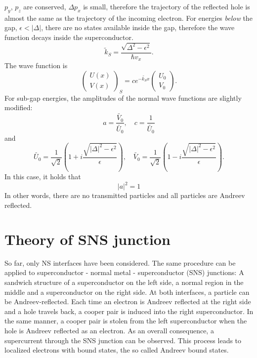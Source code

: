 $p_y$, $p_z$ are conserved, $\Delta p_x$ is small, therefore the trajectory of the reflected hole is almost the same as the trajectory of the incoming electron.
\newline
\newline
For energies \emph{below} the gap, $\epsilon < |\Delta |$, there are no states available inside the gap, therefore the wave function decays inside the superconductor. 
\begin{equation}
\tilde{k}_S= \frac{\sqrt{\Delta^2 - \epsilon^2 }}{\hbar v_x}.
\end{equation}
The wave function is
\begin{equation}
\begin{pmatrix} U(x) \\ V(x) \end{pmatrix}_S = c e^{- \tilde{k_S} x } \begin{pmatrix} U_0 \\ V_0 \end{pmatrix}.
\end{equation}
For sub-gap energies, the amplitudes of the normal wave functions are slightly modified:
\begin{equation}
a = \frac{\tilde{V_0}}{\tilde{U_0}}, \quad c = \frac{1}{\tilde{U_0}}
\end{equation}
and 
\begin{equation}
\tilde{U_0} = \frac{1}{\sqrt{2}} \left( 1 + i \frac{\sqrt{|\Delta|^2 - \epsilon^2}}{\epsilon} \right), \quad \tilde{V_0} = \frac{1}{\sqrt{2}} \left( 1 - i \frac{\sqrt{|\Delta|^2 - \epsilon^2}}{\epsilon} \right).
\end{equation}
In this case, it holds that
\begin{equation}
|a|^2 = 1
\end{equation}
In other words, there are no transmitted particles and all particles are Andreev reflected.

\section{Theory of SNS junction}
So far, only NS interfaces have been considered. The same procedure can be applied to superconductor - normal metal - superconductor (SNS) junctions: A sandwich structure of a superconductor on the left side, a normal region in the middle and a superconductor on the right side. At both interfaces, a particle can be Andreev-reflected.
Each time an electron is Andreev reflected at the right side and a hole travels back, a cooper pair is induced into the right superconductor. In the same manner, a cooper pair is stolen from the left superconductor when the hole is Andreev reflected as an electron. As an overall consequence, a supercurrent through the SNS junction can be observed. This process leads to localized electrons with bound states, the so called Andreev bound states. \\

